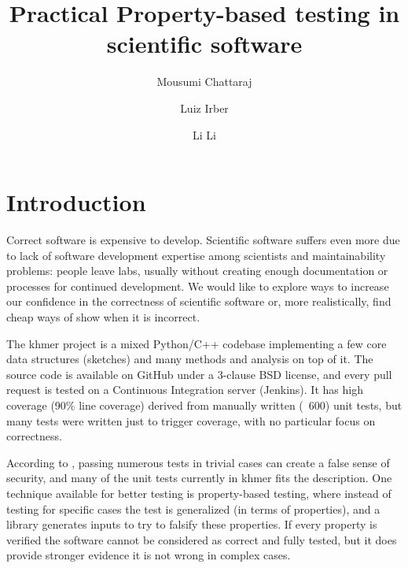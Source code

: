 \documentclass[preprint,nocopyrightspace]{sig-alternate}
\begin{document}
%

\title{Practical Property-based testing in scientific software}

\author{Mousumi Chattaraj}
\author{Luiz Irber}
\author{Li Li}


\maketitle

\begin{abstract}

\end{abstract}

\section{Introduction}
Correct software is expensive to develop.
Scientific software suffers even more due to lack of software development expertise among scientists and maintainability problems:
people leave labs,
usually without creating enough documentation or processes for continued development.
We would like to explore ways to increase our confidence in the correctness of scientific software or,
more realistically,
find cheap ways of show when it is incorrect.

The khmer project is a mixed Python/C++ codebase implementing a few core data structures (sketches) and many methods and analysis on top of it.
The source code is available on GitHub under a 3-clause BSD license,
and every pull request is tested on a Continuous Integration server (Jenkins).
It has high coverage (90\% line coverage) derived from manually written (~600) unit tests,
but many tests were written just to trigger coverage,
with no particular focus on correctness.

According to \citet{claessen_quickcheck:_2011},
passing numerous tests in trivial cases can create a false sense of security,
and many of the unit tests currently in khmer fits the description.
One technique available for better testing is property-based testing,
where instead of testing for specific cases the test is generalized (in terms of properties),
and a library generates inputs to try to falsify these properties.
If every property is verified the software cannot be considered as correct and fully tested,
but it does provide stronger evidence it is not wrong in complex cases.
\end{document}
